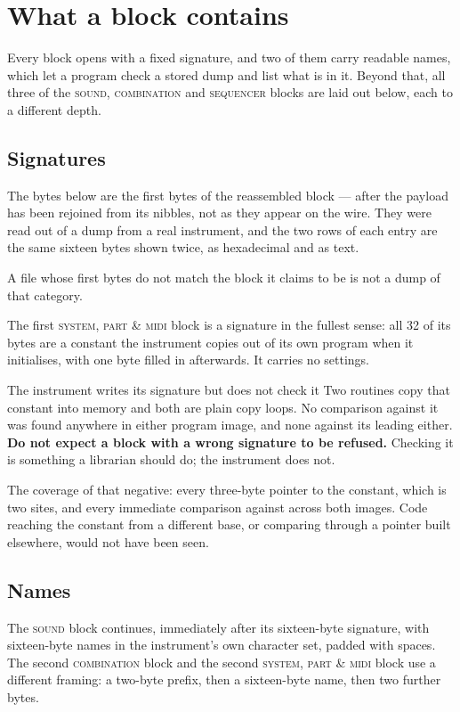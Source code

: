 \chapter{What a block contains}\label{ch:blocks}

Every block opens with a fixed signature, and two of them carry readable names, which let
a program check a stored dump and list what is in it. Beyond that, all three of the \textsc{sound}, \textsc{combination} and
\textsc{sequencer} blocks are laid out below, each to a different depth.

\section{Signatures}\label{sec:signatures}
The bytes below are the first bytes of the reassembled block --- after the payload has been
rejoined from its nibbles, not as they appear on the wire. They were read out of a dump
from a real instrument, and the two rows of each entry are the same sixteen bytes shown
twice, as hexadecimal and as text.



A file whose first bytes do not match the block it claims to be is not a dump of that
category.

The first \textsc{system, part \& midi} block is a signature in the fullest sense: all 32
of its bytes are a constant the instrument copies out of its own program when it
initialises, with one byte filled in afterwards. It carries no settings.

\begin{caution}{The instrument writes its signature but does not check it}
Two routines copy that constant into memory and both are plain copy loops. No comparison
against it was found anywhere in either program image, and none against its leading
 either. \textbf{Do not expect a block with a wrong signature to be
refused.} Checking it is something a librarian should do; the instrument does not.

The coverage of that negative: every three-byte pointer to the constant, which is two
sites, and every immediate comparison against  across both images. Code
reaching the constant from a different base, or comparing through a pointer built
elsewhere, would not have been seen.
\end{caution}

\section{Names}
The \textsc{sound} block continues, immediately after its sixteen-byte signature, with
sixteen-byte names in the instrument's own character set, padded with spaces. The second
\textsc{combination} block and the second \textsc{system, part \& midi} block use a
different framing: a two-byte prefix, then a sixteen-byte name, then two further bytes.

